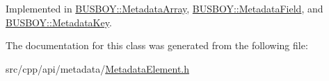 Implemented in \hyperlink{classBUSBOY_1_1MetadataArray_ad7a804d6e13ada7283e23b9e91e3b699}{BUSBOY::MetadataArray}, \hyperlink{classBUSBOY_1_1MetadataField_a2a33bad240cf8237ce9fd5c2b8fc38f8}{BUSBOY::MetadataField}, and \hyperlink{classBUSBOY_1_1MetadataKey_a6b3f94f3bc74ee43507c3c35362044dd}{BUSBOY::MetadataKey}.

The documentation for this class was generated from the following file:\begin{DoxyCompactItemize}
\item 
src/cpp/api/metadata/\hyperlink{MetadataElement_8h}{MetadataElement.h}\end{DoxyCompactItemize}
